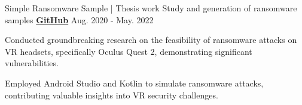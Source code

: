 \begin{cventries}

\cventry
{Simple Ransomware Sample | Thesis work} %
{Study and generation of ransomware samples} %
{\href{https://github.com/JohnnySn0w/SRS}{\textbf{GitHub}}} %
{Aug. 2020 - May. 2022} %
{
    \begin{cvitems} %
        \item{Conducted groundbreaking research on the feasibility of ransomware attacks on VR headsets, specifically Oculus Quest 2, demonstrating significant vulnerabilities.}
        \item{Employed Android Studio and Kotlin to simulate ransomware attacks, contributing valuable insights into VR security challenges.}
    \end{cvitems}
}

\end{cventries}
